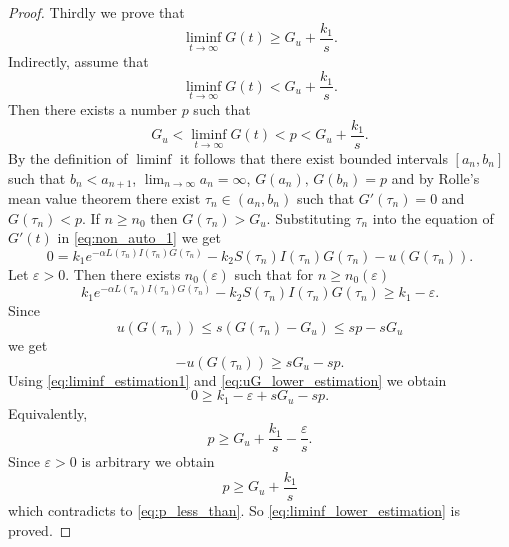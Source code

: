 \documentclass[pdflatex,sn-mathphys-num]{sn-jnl}
\theoremstyle{thmstyleone}
\theoremstyle{thmstyletwo}
\theoremstyle{thmstylethree}
\begin{document}
\begin{proof}
Thirdly we prove that
\begin{equation}\label{eq:liminf_lower_estimation}
\liminf_{t\to\infty}G(t)\geq G_u+\frac{k_1}{s}.
\end{equation}
Indirectly, assume that 
\begin{equation}
\liminf_{t\to\infty}G(t)< G_u+\frac{k_1}{s}.
\end{equation}
Then there exists a number $p$ such that 
\begin{equation}\label{eq:p_less_than}
G_u< \liminf_{t\to\infty}G(t)<p<G_u+\frac{k_1}{s}.
\end{equation}
By the definition of $\liminf$ it follows that there exist bounded intervals 
$[a_n,b_n]$ such that $b_n<a_{n+1}$, 
$\displaystyle{\lim_{n\to\infty}}a_n=\infty$, $G(a_n),\,G(b_n)=p$ and 
by Rolle's mean value theorem there 
exist $\tau_n\in (a_n,b_n)$ such that $G'(\tau_n)=0$ and 
$G(\tau_n)<p$. If $n\geq n_0$ then $G(\tau_n)>G_u$. 
Substituting $\tau_n$ into the equation of $G'(t)$ in 
\eqref{eq:non_auto_1} we get
\begin{equation}\label{eq:liminf_tau}
0=k_1e^{-\alpha L(\tau_n)I(\tau_n)G(\tau_n)}-
k_2S(\tau_n)I(\tau_n)G(\tau_n)-u(G(\tau_n)).
\end{equation}
Let $\varepsilon>0$. Then there exists $n_0(\varepsilon)$ such that 
for $n\geq n_0(\varepsilon)$
\begin{equation}\label{eq:liminf_estimation1}
k_1e^{-\alpha L(\tau_n)I(\tau_n)G(\tau_n)}-
k_2S(\tau_n)I(\tau_n)G(\tau_n)\geq k_1-\varepsilon.
\end{equation}
Since 
\begin{equation}
u(G(\tau_n))\leq s(G(\tau_n)-G_u)\leq sp-sG_u
\end{equation}
we get
\begin{equation}\label{eq:uG_lower_estimation}
-u(G(\tau_n))\geq sG_u-sp.
\end{equation}
Using \eqref{eq:liminf_estimation1} and \eqref{eq:uG_lower_estimation} we obtain
\begin{equation*}
0\geq k_1-\varepsilon+sG_u-sp.
\end{equation*}
Equivalently, 
\begin{equation}
p\geq G_u+\frac{k_1}{s}-\frac{\varepsilon}{s}.
\end{equation}
Since $\varepsilon>0$ is arbitrary we obtain
\begin{equation*}
p\geq G_u+\frac{k_1}{s}
\end{equation*}
which contradicts to \eqref{eq:p_less_than}. So 
\eqref{eq:liminf_lower_estimation} is proved.


\end{proof}
\end{document}
